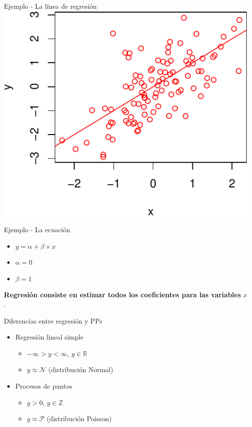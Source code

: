 \documentclass[
  11pt,
  ignorenonframetext,
]{beamer}
\providecommand{\tightlist}{%
  \setlength{\itemsep}{0pt}\setlength{\parskip}{0pt}}
\begin{document}
\begin{frame}{Ejemplo - La línea de regresión}
\protect\hypertarget{ejemplo---la-luxednea-de-regresiuxf3n}{}
\includegraphics{Generalidades_files/figure-beamer/unnamed-chunk-3-1.pdf}
\end{frame}

\begin{frame}{Ejemplo - La ecuación}
\protect\hypertarget{ejemplo---la-ecuaciuxf3n}{}
\begin{itemize}
\item
  \(y = \alpha + \beta \times x\)
\item
  \(\alpha = 0\)
\item
  \(\beta = 1\)
\end{itemize}

\textbf{Regresión consiste en estimar todos los coeficientes para las
variables} \(x\).
\end{frame}

\begin{frame}{Diferencias entre regresión y PPs}
\protect\hypertarget{diferencias-entre-regresiuxf3n-y-pps}{}
\begin{itemize}
\item
  Regresión lineal simple

  \begin{itemize}
  \tightlist
  \item
    \(-\infty > y < \infty\), \(y \in \mathbb{R}\)
  \item
    \(y \approx \mathcal{N}\) (distribución Normal)
  \end{itemize}
\item
  Procesos de puntos

  \begin{itemize}
  \tightlist
  \item
    \(y > 0\), \(y \in \mathbb{Z}\)
  \item
    \(y \approx \mathcal{P}\) (distribución Poisson)
  \end{itemize}
\end{itemize}
\end{frame}
\end{document}
